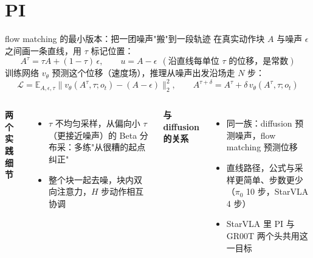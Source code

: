 \documentclass[aspectratio=169,10pt]{beamer}
\begin{document}
\section{PI}
\begin{frame}{flow matching 的最小版本：把一团噪声"搬"到一段轨迹}
  在真实动作块 $A$ 与噪声 $\epsilon$ 之间画一条直线，用 $\tau$ 标记位置：
  \[
    A^{\tau}=\tau A+(1-\tau)\,\epsilon,\qquad
    u = A-\epsilon\ \ (\text{沿直线每单位 } \tau \text{ 的位移，是常数})
  \]
  训练网络 $v_\theta$ 预测这个位移（速度场），推理从噪声出发沿场走 $N$ 步：
  \[
    \mathcal{L}=\mathbb{E}_{A,\epsilon,\tau}\big\|v_\theta(A^{\tau},\tau;o_t)-(A-\epsilon)\big\|_2^2,\qquad
    A^{\tau+\delta}=A^{\tau}+\delta\,v_\theta(A^{\tau},\tau;o_t)
  \]
  \begin{columns}[T]
    \textbf{两个实践细节}
    \begin{itemize}
      \item $\tau$ 不均匀采样，从偏向小 $\tau$（更接近噪声）的 Beta 分布采：多练"从很糟的起点纠正"
      \item 整个块一起去噪，块内双向注意力，$H$ 步动作相互协调
    \end{itemize}
    \textbf{与 diffusion 的关系}
    \begin{itemize}
      \item 同一族：diffusion 预测噪声，flow matching 预测位移
      \item 直线路径，公式与采样更简单、步数更少（$\pi_0$ 10 步，StarVLA 4 步）
      \item StarVLA 里 PI 与 GR00T 两个头共用这一目标
    \end{itemize}
  \end{columns}
\end{frame}
\end{document}
